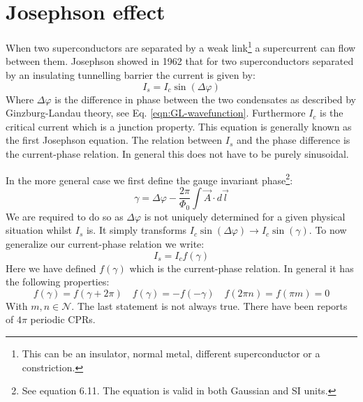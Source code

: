 \section{Josephson effect}
\label{sec:josephson-effect}
When two superconductors are separated by a weak link\footnote{This can be an insulator, normal metal, different superconductor or a constriction.} a supercurrent can flow between them. Josephson showed in 1962 that for two superconductors separated by an insulating tunnelling barrier the current is given by\cite{tinkhamIntroductionSuperconductivity}:
\begin{equation}
	I_s = I_c \sin(\Delta \varphi)
	\label{eqn:1st-josephson-relation}
\end{equation}
Where $\Delta \varphi$ is the difference in phase between the two condensates as described by Ginzburg-Landau theory, see Eq. \ref{eqn:GL-wavefunction}. Furthermore $I_c$ is the critical current which is a junction property. This equation is generally known as the first Josephson equation. The relation between $I_s$ and the phase difference is the current-phase relation. In general this does not have to be purely sinusoidal.\cite{golubovCurrentphaseRelationJosephson2004a}

In the more general case we first define the gauge invariant phase\footnote{See  equation 6.11. The equation is valid in both Gaussian and SI units.}:
\begin{equation}
	\gamma = \Delta \varphi - \frac{2\pi}{\Phi_0}\int \vec{A} \cdot d\vec{l}
	\label{eqn:gauge-invariant-phase}
\end{equation}
We are required to do so as $\Delta \varphi$ is not uniquely determined for a given physical situation whilst $I_s$ is.\cite{tinkhamIntroductionSuperconductivity} It simply transforms $I_c \sin(\Delta \varphi) \to I_c \sin(\gamma)$. To now generalize our current-phase relation we write:
\begin{equation}
	I_s = I_c f(\gamma)
\end{equation}
Here we have defined $f(\gamma)$ which is the current-phase relation. In general it has the following properties\cite{golubovCurrentphaseRelationJosephson2004a}:
\begin{equation}
	f(\gamma) = f(\gamma + 2\pi) \quad f(\gamma) = -f(-\gamma) \quad f(2\pi n) = f(\pi m) = 0
\end{equation}
With $m,n \in \mathcal{N}$. The last statement is not always true. There have been reports of $4\pi$ periodic CPRs.\cite{endresCurrentPhaseRelation2023}

